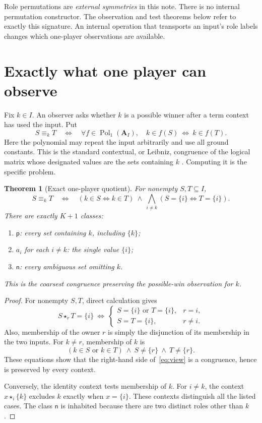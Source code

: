 \documentclass[11pt]{article}
\newtheorem{theorem}{Theorem}[section]
\newcommand{\A}{\mathbf A_I}
\newcommand{\ow}[1]{\mathbin{\star_{#1}}}
\newcommand{\pv}{\mathsf p}
\newcommand{\nv}{\mathsf n}
\begin{document}
Role permutations are \emph{external symmetries} in this note. There is no
internal permutation constructor. The observation and test theorems below
refer to exactly this signature. An internal operation that transports an
input's role labels changes which one-player observations are available.

\section{Exactly what one player can observe}

Fix $k\in I$. An observer asks whether $k$ is a possible winner after a
term context has used the input. Put
\[
 S\equiv_k T\quad\Longleftrightarrow\quad
 \forall f\in\operatorname{Pol}_1(\A),\quad
       k\in f(S)\ \Longleftrightarrow\ k\in f(T).
\]
Here the polynomial may repeat the input arbitrarily and use all ground
constants. This is the standard contextual, or Leibniz, congruence of the
logical matrix whose designated values are the sets containing $k$
\cite{BlokPigozzi1989,Font1993}. Computing it is the specific problem.

\begin{theorem}[Exact one-player quotient]\label{thm:view}
For nonempty $S,T\subseteq I$,
\begin{equation}\label{eq:view}
 S\equiv_k T\quad\Longleftrightarrow\quad
 (k\in S\Longleftrightarrow k\in T)
 \ \land\ \bigwedge_{i\ne k}(S=\{i\}\Longleftrightarrow T=\{i\}).
\end{equation}
There are exactly $K+1$ classes:
\begin{enumerate}
\item $\pv$: every set containing $k$, including $\{k\}$;
\item $a_i$ for each $i\ne k$: the single value $\{i\}$;
\item $\nv$: every ambiguous set omitting $k$.
\end{enumerate}
This is the coarsest congruence preserving the possible-win observation
for $k$.
\end{theorem}
\begin{proof}
For nonempty $S,T$, direct calculation gives
\[
 S\ow r T=\{i\}\ \Longleftrightarrow\
 \begin{cases}
 S=\{i\}\text{ or }T=\{i\},&r=i,\\
 S=T=\{i\},&r\ne i.
 \end{cases}
\]
Also, membership of the owner $r$ is simply the disjunction of its
membership in the two inputs. For $k\ne r$, membership of $k$ is
\[
 (k\in S\text{ or }k\in T)\ \land\ S\ne\{r\}\ \land\ T\ne\{r\}.
\]
These equations show that the right-hand side of~\eqref{eq:view} is a
congruence, hence is preserved by every context.

Conversely, the identity context tests membership of $k$. For $i\ne k$,
the context $x\ow i\{k\}$ excludes $k$ exactly when $x=\{i\}$. These
contexts distinguish all the listed cases. The class $\nv$ is inhabited
because there are two distinct roles other than $k$.
\end{proof}
\end{document}
